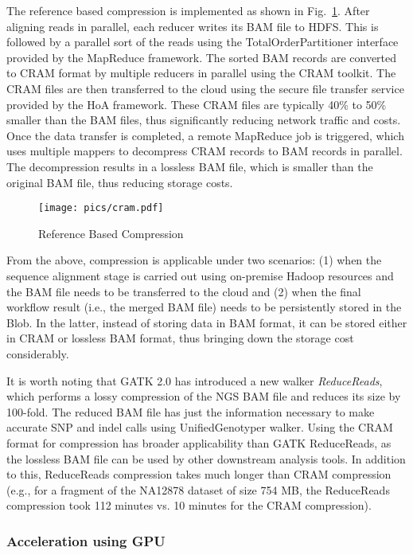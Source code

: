 The reference based compression is implemented as shown in Fig.~\ref{fig:cram}. After aligning reads in parallel, each reducer writes its BAM file to HDFS. This is followed by a parallel sort of the reads using the TotalOrderPartitioner interface provided by the MapReduce framework. The sorted BAM records are converted to CRAM format by multiple reducers in parallel using the CRAM toolkit. The CRAM files are then transferred to the cloud using the secure file transfer service provided by the HoA framework. These CRAM files are typically 40\% to 50\% smaller than the BAM files, thus significantly reducing network traffic and costs. Once the data transfer is completed, a remote MapReduce job is triggered, which uses multiple mappers to decompress CRAM records to BAM records in parallel. The decompression results in a lossless BAM file, which is smaller than the original BAM file, thus reducing storage costs.

\begin{figure}[!htb]
  \centering
  \texttt{[image: pics/cram.pdf]}
  \caption{Reference Based Compression}
  \label{fig:cram}
\end{figure}

From the above, compression is applicable under two scenarios: (1) when the sequence alignment stage is carried out using on-premise Hadoop resources and the BAM file needs to be transferred to the cloud and (2) when the final workflow result (i.e., the merged BAM file) needs to be persistently stored in the Blob. In the latter, instead of storing data in BAM format, it can be stored either in CRAM or lossless BAM format, thus bringing down the storage cost considerably. 

It is worth noting that GATK 2.0 has introduced a new walker \textit{ReduceReads}, which performs a lossy compression of the NGS BAM file and reduces its size by 100-fold.  The reduced BAM file has just the information necessary to make accurate SNP and indel calls using UnifiedGenotyper walker. Using the CRAM format for compression has broader applicability than GATK ReduceReads, as the lossless BAM file can be used by other downstream analysis tools. In addition to this, ReduceReads compression takes much longer than CRAM compression (e.g., for a fragment of the NA12878 dataset of size 754 MB, the ReduceReads compression took 112 minutes vs. 10 minutes for the CRAM compression).

\subsubsection{Acceleration using GPU}

